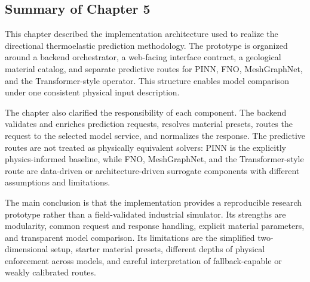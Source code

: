 \subsection{Summary of Chapter 5}

This chapter described the implementation architecture used to realize the directional thermoelastic prediction methodology. The prototype is organized around a backend orchestrator, a web-facing interface contract, a geological material catalog, and separate predictive routes for PINN, FNO, MeshGraphNet, and the Transformer-style operator. This structure enables model comparison under one consistent physical input description.

The chapter also clarified the responsibility of each component. The backend validates and enriches prediction requests, resolves material presets, routes the request to the selected model service, and normalizes the response. The predictive routes are not treated as physically equivalent solvers: PINN is the explicitly physics-informed baseline, while FNO, MeshGraphNet, and the Transformer-style route are data-driven or architecture-driven surrogate components with different assumptions and limitations.

The main conclusion is that the implementation provides a reproducible research prototype rather than a field-validated industrial simulator. Its strengths are modularity, common request and response handling, explicit material parameters, and transparent model comparison. Its limitations are the simplified two-dimensional setup, starter material presets, different depths of physical enforcement across models, and careful interpretation of fallback-capable or weakly calibrated routes.
